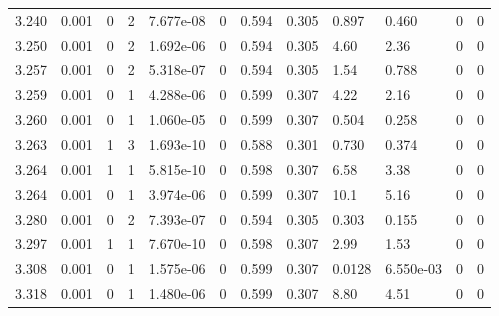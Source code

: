\documentclass[preview]{standalone}
\begin{document}
{{{{{{{\begin{tabular}{L{1.2cm}C{1.2cm} C{0.3cm}C{0.5cm} C{1.4cm}C{1.4cm} C{1.4cm}C{1.4cm} C{1.6cm}C{1.6cm} C{1.6cm}C{1.6cm}}
  3.240  &  0.001  & 0     &  2 &  7.677e-08  & 0  &  0.594&   0.305& 0.897 & 0.460   &  0 & 0  \\ 
  3.250  &  0.001  & 0     &  2 &  1.692e-06  & 0  &  0.594&   0.305& 4.60 & 2.36   &  0 & 0  \\ 
  3.257  &  0.001  & 0     &  2 &  5.318e-07  & 0  &  0.594&   0.305& 1.54 & 0.788   &  0 & 0  \\ 
  3.259  &  0.001  & 0     &  1 &  4.288e-06  & 0  &  0.599&   0.307& 4.22 & 2.16   &  0 & 0  \\ 
  3.260  &  0.001  & 0     &  1 &  1.060e-05  & 0  &  0.599&   0.307& 0.504 & 0.258   &  0 & 0  \\ 
  3.263  &  0.001  & 1     &  3 &  1.693e-10  & 0  &  0.588&   0.301& 0.730 & 0.374   &  0 & 0  \\ 
  3.264  &  0.001  & 1     &  1 &  5.815e-10  & 0  &  0.598&   0.307& 6.58 & 3.38   &  0 & 0  \\ 
  3.264  &  0.001  & 0     &  1 &  3.974e-06  & 0  &  0.599&   0.307& 10.1 & 5.16   &  0 & 0  \\ 
  3.280  &  0.001  & 0     &  2 &  7.393e-07  & 0  &  0.594&   0.305& 0.303 & 0.155   &  0 & 0  \\ 
  3.297  &  0.001  & 1     &  1 &  7.670e-10  & 0  &  0.598&   0.307& 2.99 & 1.53   &  0 & 0  \\ 
  3.308  &  0.001  & 0     &  1 &  1.575e-06  & 0  &  0.599&   0.307& 0.0128 & 6.550e-03   &  0 & 0  \\ 
  3.318  &  0.001  & 0     &  1 &  1.480e-06  & 0  &  0.599&   0.307& 8.80 & 4.51   &  0 & 0  \\ 
\hline 
\end{tabular} 

}}}}}}}
\end{document}
